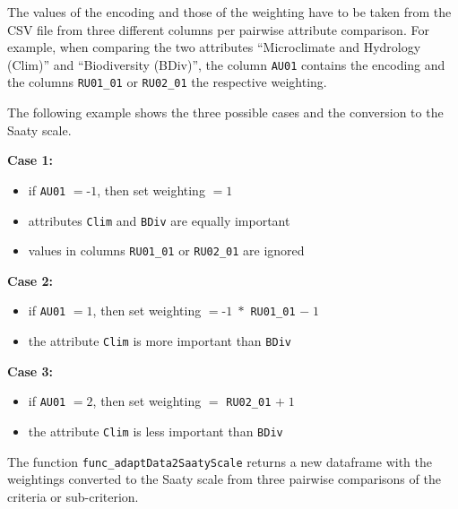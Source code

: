 \documentclass [oneside,10pt,a4paper,ngerman,BCOR10mm,headsepline,parindent,final]{scrartcl}
\providecommand{\tightlist}{%
      \setlength{\itemsep}{0pt}\setlength{\parskip}{0pt}}
\begin{document}
The values of the encoding and those of the weighting have to be taken
from the CSV file from three different columns per pairwise attribute
comparison. For example, when comparing the two attributes
``Microclimate and Hydrology (Clim)'' and ``Biodiversity (BDiv)'', the
column \texttt{AU01} contains the encoding and the columns
\texttt{RU01\_01} or \texttt{RU02\_01} the respective weighting.

The following example shows the three possible cases and the conversion
to the Saaty scale.

\textbf{Case 1:}

\begin{itemize}
\tightlist
\item
  if \texttt{AU01} \(= \text{-}1\), then set weighting \(= 1\)
\item
  attributes \texttt{Clim} and \texttt{BDiv} are equally important
\item
  values in columns \texttt{RU01\_01} or \texttt{RU02\_01} are ignored
\end{itemize}

\textbf{Case 2:}

\begin{itemize}
\tightlist
\item
  if \texttt{AU01} \(= 1\), then set weighting \(= \text{-}1\;*\)
  \texttt{RU01\_01} \(-\;1\)
\item
  the attribute \texttt{Clim} is more important than \texttt{BDiv}
\end{itemize}

\textbf{Case 3:}

\begin{itemize}
\tightlist
\item
  if \texttt{AU01} \(= 2\), then set weighting \(=\) \texttt{RU02\_01}
  \(+\;1\)
\item
  the attribute \texttt{Clim} is less important than \texttt{BDiv}
\end{itemize}

The function \texttt{func\_adaptData2SaatyScale} returns a new dataframe
with the weightings converted to the Saaty scale from three pairwise
comparisons of the criteria or sub-criterion.
\end{document}
